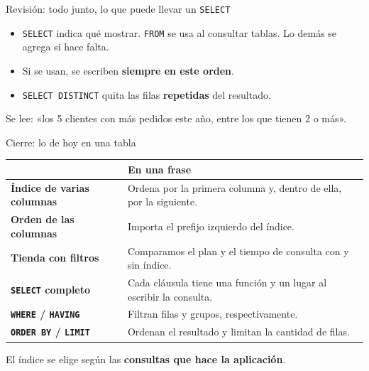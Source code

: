 \documentclass[aspectratio=169,10pt,c]{beamer}
\newcommand{\kw}[1]{\textcolor{utpRojo}{\textbf{#1}}}
\newcommand{\piezax}{7.6}
\newcommand{\pieza}[3]{%
  \node[pieza] at (0,#1) {#2};
  \node[para] at (\piezax,#1) {\textcolor{utpRojo}{$\blacktriangleleft$}\ #3};}
\begin{document}
\begin{frame}{Revisión: todo junto, lo que puede llevar un \texttt{SELECT}}
\begin{center}
\end{center}
\vspace{-0.05cm}
\begin{itemize}\setlength\itemsep{3pt}
  \item \texttt{SELECT} indica qué mostrar. \texttt{FROM} se usa al consultar tablas. Lo demás se agrega si hace falta.
  \item Si se usan, se escriben \textbf{siempre en este orden}.
  \item \texttt{SELECT DISTINCT} quita las filas \textbf{repetidas} del resultado.
\end{itemize}
\vspace{0.05cm}
\small\color{utpGris} Se lee: «los 5 clientes con más pedidos este año, entre los que tienen 2 o más».
\end{frame}
\begin{frame}{Cierre: lo de hoy en una tabla}
\begin{center}
\small
\renewcommand{\arraystretch}{1.45}
\begin{tabular}{>{\raggedright\bfseries}p{4.2cm}>{\raggedright\arraybackslash}p{8.6cm}}
\toprule
& \bfseries En una frase \\
\midrule
Índice de varias columnas & Ordena por la primera columna y, dentro de ella, por la siguiente. \\
Orden de las columnas & Importa el prefijo izquierdo del índice. \\
Tienda con filtros & Comparamos el plan y el tiempo de consulta con y sin índice. \\
\texttt{SELECT} completo & Cada cláusula tiene una función y un lugar al escribir la consulta. \\
\texttt{WHERE} / \texttt{HAVING} & Filtran filas y grupos, respectivamente. \\
\texttt{ORDER BY} / \texttt{LIMIT} & Ordenan el resultado y limitan la cantidad de filas. \\

\bottomrule
\end{tabular}
\end{center}
\vspace{0.25cm}
\small El índice se elige según las \textbf{consultas que hace la aplicación}.
\end{frame}
\end{document}
